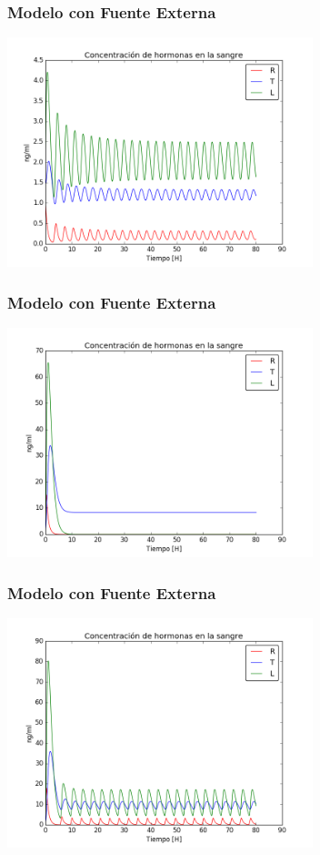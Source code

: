 \documentclass[10pt]{beamer}
\begin{document}
\begin{frame}
\frametitle{Modelo con Fuente Externa}
\begin{center}
 \includegraphics[width=3.5in]{imagenes/Graficas/Modelo_fuente_externa/FE_modelo1_valor_no_critico.png}
\end{center}
\end{frame}

\begin{frame}
\frametitle{Modelo con Fuente Externa}
\begin{center}
 \includegraphics[width=3.5in]{imagenes/Graficas/Modelo_fuente_externa/FE_modelo2_valor_critico.png}
\end{center}
\end{frame}

\begin{frame}
\frametitle{Modelo con Fuente Externa}
\begin{center}
 \includegraphics[width=3.5in]{imagenes/Graficas/Modelo_fuente_externa/FE_modelo2_valor_no_critico.png}
\end{center}
\end{frame}
\end{document}
